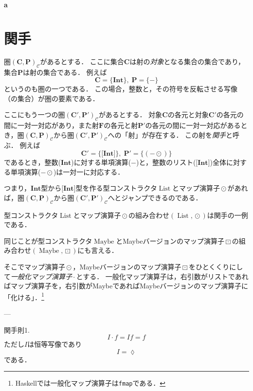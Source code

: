 \documentclass[twocolumn]{jsbook}
\newcommand{\hsklType}[1]{\textbf{#1}}
\newcommand{\hsklTypeConstructor}[1]{\mathop{\mathrm{#1}}}
\DeclareMathOperator{\hsklFmap}{\cdot}
\DeclareMathOperator{\hsklListConstructor}{\hsklTypeConstructor{List}}
\DeclareMathOperator{\hsklMap}{\odot}
\DeclareMathOperator{\hsklMaybeConstructor}{\hsklTypeConstructor{Maybe}}
\DeclareMathOperator{\hsklMaybeMap}{\boxdot}
\newcommand{\hsklInt}{\hsklType{Int}}
\newcommand{\hsklListType}[1]{\boldsymbol{[}#1\boldsymbol{]}}
\newcommand{\mathLambdaAnonymousParameter}{\lozenge}
\newcommand{\mathSet}[1]{\mathbf{#1}}
\newcommand{\mathCategoryShort}[2]{(#1,#2)_\mathcal{C}}
\newcommand{\keyword}[1]{\emph{#1}}
\newcommand{\code}[1]{\texttt{#1}}
\newenvironment{leader}{\begingroup\bf}{\endgroup}
\begin{document}
\begin{leader}
a
\end{leader}


\section{関手}

圏$\mathCategoryShort{\mathSet{C}}{\mathSet{P}}$があるとする．
ここに集合$\mathSet{C}$は射の\keyword{対象}となる集合の集合であり，集合$\mathSet{P}$は射の集合である．
例えば$$\mathSet{C}=\{\hsklInt\},\;\mathSet{P}=\{-\}$$というのも圏の一つである．
この場合，整数と，その符号を反転させる写像（の集合）が圏の要素である．

ここにもう一つの圏$\mathCategoryShort{\mathSet{C}'}{\mathSet{P}'}$があるとする．
対象$\mathSet{C}$の各元と対象$\mathSet{C}'$の各元の間に一対一対応があり，また射$\mathSet{F}$の各元と射$\mathSet{P}'$の各元の間に一対一対応があるとき，圏$\mathCategoryShort{\mathSet{C}}{\mathSet{P}}$から圏$\mathCategoryShort{\mathSet{C}'}{\mathSet{P}'}$への「射」が存在する．
この射を\keyword{関手}と呼ぶ．
例えば$$\mathSet{C}'=\{\hsklListType{\hsklInt}\},\;\mathSet{P}'=\{(-\hsklMap)\}$$であるとき，整数($\hsklInt$)に対する単項演算($-$)と，整数のリスト($\hsklListType{\hsklInt}$)全体に対する単項演算($-\hsklMap$)は一対一に対応する．

つまり，$\hsklInt$型から$\hsklListType{\hsklInt}$型を作る型コンストラクタ$\hsklListConstructor$とマップ演算子$\hsklMap$があれば，圏$\mathCategoryShort{\mathSet{C}}{\mathSet{P}}$から圏$\mathCategoryShort{\mathSet{C}'}{\mathSet{P}'}$へとジャンプできるのである．

型コンストラクタ$\hsklListConstructor$とマップ演算子$\hsklMap$の組み合わせ$(\hsklListConstructor,\hsklMap)$は関手の一例である．

同じことが型コンストラクタ$\hsklMaybeConstructor$とMaybeバージョンのマップ演算子$\hsklMaybeMap$の組み合わせ$(\hsklMaybeConstructor,\hsklMaybeMap)$にも言える．

そこでマップ演算子$\hsklMap$，Maybeバージョンのマップ演算子$\hsklMaybeMap$をひとくくりにして\keyword{一般化マップ演算子}$\hsklFmap$とする．
一般化マップ演算子は，右引数がリストであればマップ演算子を，右引数がMaybeであればMaybeバージョンのマップ演算子に「化ける」．\footnote{Haskellでは一般化マップ演算子は\code{fmap}である．}

---

関手則1.
$$I\hsklFmap f=If=f$$
ただし$I$は恒等写像であり
$$I=\mathLambdaAnonymousParameter$$
である．
\end{document}
